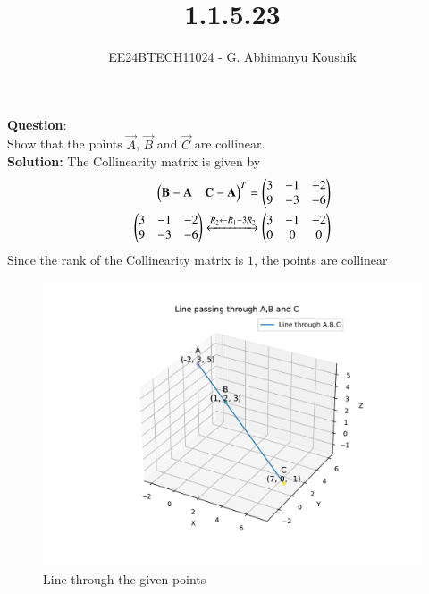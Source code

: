 \documentclass[journal]{IEEEtran}
\begin{document}

\vspace{3cm}

\title{1.1.5.23}
\author{EE24BTECH11024 - G. Abhimanyu Koushik
}
{\let\newpage\relax\maketitle}

\renewcommand{\thefigure}{\theenumi}
\renewcommand{\thetable}{\theenumi}
\setlength{\intextsep}{10pt} %


\renewcommand{\thetable}{\theenumi}


\textbf{Question}:\\
Show that the points $\vec{A}$, $\vec{B}$ and $\vec{C}$ are collinear.
\\
\textbf{Solution: }
The Collinearity matrix is given by\\
\begin{align}
\begin{pmatrix}
   \mathbf{B}-\mathbf{A} & \mathbf{C}-\mathbf{A}
 \end{pmatrix}^T = \begin{pmatrix}
   3 & -1 & -2
   \\
   9 & -3 & -6
   \end{pmatrix}\\
 \begin{pmatrix}
   3 & -1 & -2
   \\
   9 & -3 & -6
   \end{pmatrix}
 \xleftrightarrow[]{R_2 \leftarrow {R_1-3R_2}}
 \begin{pmatrix}
   3 & -1 & -2
   \\
   0 & 0 & 0
   \end{pmatrix}
\end{align}
Since the rank of the Collinearity matrix is $1$, the points are collinear
\begin{figure}[h!]
   \centering
   \includegraphics[width=0.7\linewidth]{figs/fig.pdf}
   \caption{Line through the given points}
   \label{stemplot}
\end{figure}
\end{document}

